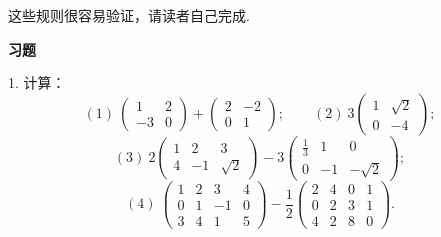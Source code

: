 \documentclass[UTF8,12pt,a4paper,fontset=fandol]{ctexart}
\begin{document}
这些规则很容易验证，请读者自己完成.

\begin{center}
\textbf{习\quad 题}
\end{center}

1. 计算：
\[
(1)\ \left(\begin{array}{cc}
1 & 2\\
-3 & 0
\end{array}\right)+
\left(\begin{array}{cc}
2 & -2\\
0 & 1
\end{array}\right);
\qquad
(2)\ 3\left(\begin{array}{cc}
1 & \sqrt{2}\\
0 & -4
\end{array}\right);
\]
\[
(3)\ 2\left(\begin{array}{ccc}
1 & 2 & 3\\
4 & -1 & \sqrt{2}
\end{array}\right)
-3\left(\begin{array}{ccc}
\frac{1}{3} & 1 & 0\\
0 & -1 & -\sqrt{2}
\end{array}\right);
\]
\[
(4)\ \left(\begin{array}{cccc}
1 & 2 & 3 & 4\\
0 & 1 & -1 & 0\\
3 & 4 & 1 & 5
\end{array}\right)
-\frac{1}{2}\left(\begin{array}{cccc}
2 & 4 & 0 & 1\\
0 & 2 & 3 & 1\\
4 & 2 & 8 & 0
\end{array}\right).
\]
\end{document}
